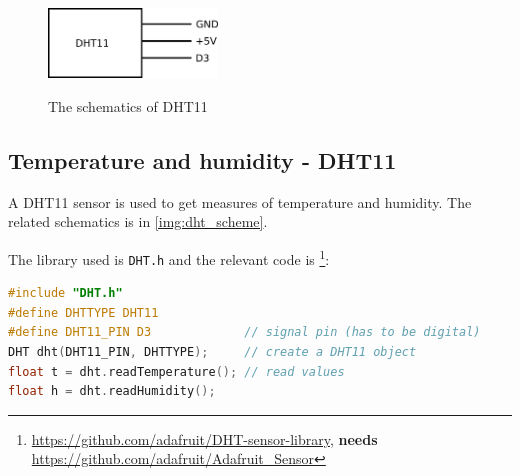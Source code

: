 \begin{figure}[!htb]
  \centering
  \includegraphics[width=0.4\textwidth]{latex/img/dht_scheme.png}\label{img:dht_scheme}
  \caption{The schematics of DHT11}
\end{figure}

\subsection{Temperature and humidity - DHT11}
A DHT11 sensor is used to get measures of temperature and humidity. The related schematics is in \autoref{img:dht_scheme}.

The library used is \texttt{DHT.h} and the relevant code is \footnote{\url{https://github.com/adafruit/DHT-sensor-library}, \textbf{needs} \url{https://github.com/adafruit/Adafruit_Sensor}}:

\begin{lstlisting}[language=C]
#include "DHT.h"
#define DHTTYPE DHT11
#define DHT11_PIN D3             // signal pin (has to be digital)
DHT dht(DHT11_PIN, DHTTYPE);     // create a DHT11 object
float t = dht.readTemperature(); // read values
float h = dht.readHumidity();
\end{lstlisting}







